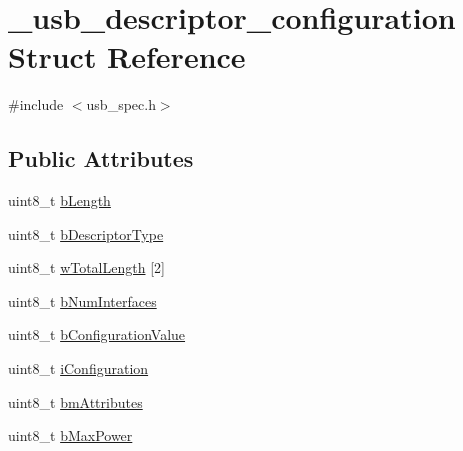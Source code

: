 \hypertarget{struct__usb__descriptor__configuration}{\section{\-\_\-usb\-\_\-descriptor\-\_\-configuration Struct Reference}
\label{struct__usb__descriptor__configuration}
}


{\ttfamily \#include $<$usb\-\_\-spec.\-h$>$}

\subsection*{Public Attributes}
\begin{DoxyCompactItemize}
\item 
uint8\-\_\-t \hyperlink{struct__usb__descriptor__configuration_a34d668a8771af3780d6221681d5f82ac}{b\-Length}
\item 
uint8\-\_\-t \hyperlink{struct__usb__descriptor__configuration_a0e1721ddbf1a3e7f97a589b7828fc78e}{b\-Descriptor\-Type}
\item 
uint8\-\_\-t \hyperlink{struct__usb__descriptor__configuration_a48286464c99b72970be8a792b4ed9a67}{w\-Total\-Length} \mbox{[}2\mbox{]}
\item 
uint8\-\_\-t \hyperlink{struct__usb__descriptor__configuration_ab90d30619b414fb542bdcda221be8f11}{b\-Num\-Interfaces}
\item 
uint8\-\_\-t \hyperlink{struct__usb__descriptor__configuration_ab0e74a9f9f4ceafe8037f926f4d9a82a}{b\-Configuration\-Value}
\item 
uint8\-\_\-t \hyperlink{struct__usb__descriptor__configuration_ad43afb5fb339c677e702c103b62263f1}{i\-Configuration}
\item 
uint8\-\_\-t \hyperlink{struct__usb__descriptor__configuration_ab7059742b69b933a2f44d04be24f4fed}{bm\-Attributes}
\item 
uint8\-\_\-t \hyperlink{struct__usb__descriptor__configuration_a08403713b95bd8cf09e4f5c2e3c77eec}{b\-Max\-Power}
\end{DoxyCompactItemize}


